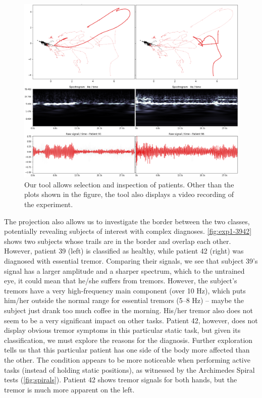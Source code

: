 \begin{figure}[ht]
\centering
\includegraphics[width=\linewidth]{figures/nemo/exp1-9196.png}
\caption{Our tool allows selection and inspection of patients. Other than the plots shown in the figure, the tool also displays a video recording of the experiment. }
\label{fig:exp1-9196}
\end{figure}

The projection also allows us to investigate the border between the two classes, potentially revealing subjects of interest with complex diagnoses.
\cref{fig:exp1-3942} shows two subjects whose trails are in the border and overlap each other. However, patient 39 (left) is classified as healthy, while patient 42 (right) was diagnosed with essential tremor. Comparing their signals, we see that subject 39's signal has a larger amplitude and a sharper spectrum, which to the untrained eye, it could mean that he/she suffers from tremors. However, the subject's tremors have a very high-frequency main component (over 10 Hz), which puts him/her outside the normal range for essential tremors (5--8 Hz) -- maybe the subject just drank too much coffee in the morning. His/her tremor also does not seem to be a very significant impact on other tasks. Patient 42, however, does not display obvious tremor symptoms in this particular static task, but given its classification, we must explore the reasons for the diagnosis.
Further exploration tells us that this particular patient has one side of the body more affected than the other. The condition appears to be more noticeable when performing active tasks (instead of holding static positions), as witnessed by the Archimedes Spiral tests (\cref{fig:spirals}). Patient 42 shows tremor signals for both hands, but the tremor is much more apparent on the left.

